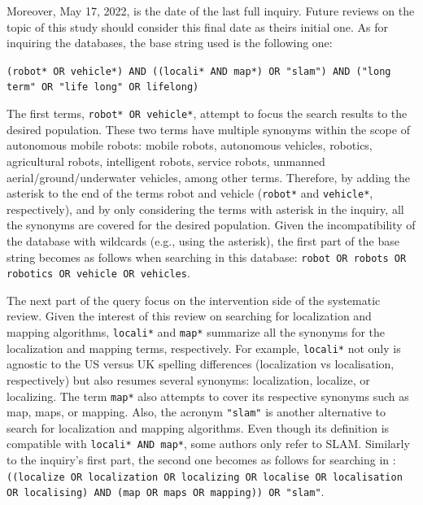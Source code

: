 \documentclass[10pt,a4paper,notitlepage,twocolumn,oneside]{article}
\begin{document}
Moreover, May 17, 2022, is the date of the last full inquiry. Future reviews on the topic of this study should consider this final date as theirs initial one. As for inquiring the databases, the base string used is the following one:

\vspace{1em}

\texttt{(robot* OR vehicle*) AND ((locali* AND map*) OR "slam") AND ("long term" OR "life long" OR lifelong)}

\vspace{1em}

The first terms, \texttt{robot* OR vehicle*}, attempt to focus the search results to the desired population. These two terms have multiple synonyms within the scope of autonomous mobile robots: mobile robots, autonomous vehicles, robotics, agricultural robots, intelligent robots, service robots, unmanned aerial/ground/underwater vehicles, among other terms. Therefore, by adding the asterisk to the end of the terms robot and vehicle (\texttt{robot*} and \texttt{vehicle*}, respectively), and by only considering the terms with asterisk in the inquiry, all the synonyms are covered for the desired population. Given the incompatibility of the  database with wildcards (e.g., using the asterisk), the first part of the base string becomes as follows when searching in this database: \texttt{robot OR robots OR robotics OR vehicle OR vehicles}.

The next part of the query focus on the intervention side of the systematic review. Given the interest of this review on searching for localization and mapping algorithms, \texttt{locali*} and \texttt{map*} summarize all the synonyms for the localization and mapping terms, respectively. For example, \texttt{locali*} not only is agnostic to the US versus UK spelling differences (localization vs localisation, respectively) but also resumes several synonyms: localization, localize, or localizing. The term \texttt{map*} also attempts to cover its respective synonyms such as map, maps, or mapping.
Also, the acronym \texttt{"slam"} is another alternative to search for localization and mapping algorithms. Even though its definition is compatible with \texttt{locali* AND map*}, some authors only refer to SLAM.
Similarly to the inquiry's first part, the second one becomes as follows for searching in : \texttt{((localize OR localization OR localizing OR localise OR localisation OR localising) AND (map OR maps OR mapping)) OR "slam"}.
\end{document}
